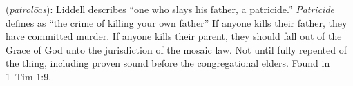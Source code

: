 \item[Father-murderer,]

(\textit{patrolōas}):
Liddell describes ``one who slays his father, a patricide.'' \emph{Patricide} defines as ``the crime of killing your own father'' If anyone kills their father, they have committed murder. If anyone kills their parent, they should fall out of the Grace of God unto the jurisdiction of the mosaic law. Not until fully repented of the thing, including proven sound before the congregational elders.
Found in 1~Tim 1:9.
